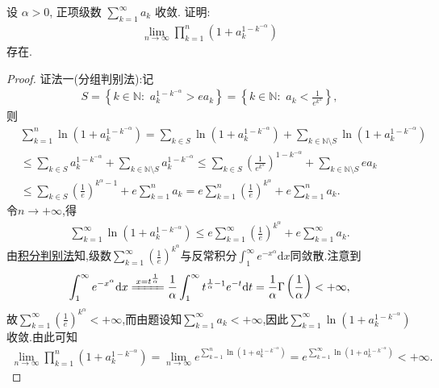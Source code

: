 \documentclass[../../main.tex]{subfiles}%
\begin{document}
\begin{example}
设 $\alpha>0$, 正项级数 $\sum\limits_{k=1}^{\infty} a_k$ 收敛. 证明:
\begin{align*}
\lim\limits_{n\to\infty} \prod\limits_{k=1}^{n} \left(1 + a_k^{1-k^{-\alpha}}\right)
\end{align*}
存在.
\end{example}
\begin{proof}

{\color{blue}证法一(分组判别法):}记
\begin{align*}
S=\left\{ k\in \mathbb{N} :\,\,a_{k}^{1-k^{-\alpha}}>ea_k \right\} =\left\{ k\in \mathbb{N} :\,\,a_k<\frac{1}{e^{k^{\alpha}}} \right\},
\end{align*}
则
\begin{align*}
&\sum\limits_{k=1}^n{\ln \left( 1+a_{k}^{1-k^{-\alpha}} \right)}=\sum\limits_{k\in S}{\ln \left( 1+a_{k}^{1-k^{-\alpha}} \right)}+\sum\limits_{k\in \mathbb{N} \setminus S}{\ln \left( 1+a_{k}^{1-k^{-\alpha}} \right)}
\\
&\leqslant \sum\limits_{k\in S}{a_{k}^{1-k^{-\alpha}}}+\sum\limits_{k\in \mathbb{N} \setminus S}{a_{k}^{1-k^{-\alpha}}}\leqslant \sum\limits_{k\in S}{\left( \frac{1}{e^{k^{\alpha}}} \right) ^{1-k^{-\alpha}}}+\sum\limits_{k\in \mathbb{N} \setminus S}{ea_k}
\\
&\leqslant \sum\limits_{k\in S}{\left( \frac{1}{e} \right) ^{k^{\alpha}-1}}+e\sum\limits_{k=1}^n{a_k}=e\sum\limits_{k=1}^n{\left( \frac{1}{e} \right) ^{k^{\alpha}}}+e\sum\limits_{k=1}^n{a_k}.
\end{align*}
令$n\rightarrow +\infty$,得
\begin{align*}
\sum\limits_{k=1}^{\infty}{\ln \left( 1+a_{k}^{1-k^{-\alpha}} \right)}\leqslant e\sum\limits_{k=1}^{\infty}{\left( \frac{1}{e} \right) ^{k^{\alpha}}}+e\sum\limits_{k=1}^{\infty}{a_k}.
\end{align*}
由\hyperref[theorem:积分判别法]{积分判别法}知,级数$\sum\limits_{k=1}^{\infty}{\left( \frac{1}{e} \right) ^{k^{\alpha}}}$与反常积分$\int_1^{\infty}{e^{-x^{\alpha}}\mathrm{d}x}$同敛散.注意到
\begin{align*}
\int_1^{\infty}{e^{-x^{\alpha}}\mathrm{d}x}\xlongequal{x=t^{\frac{1}{\alpha}}}\frac{1}{\alpha}\int_1^{\infty}{t^{\frac{1}{\alpha}-1}e^{-t}\mathrm{d}t}=\frac{1}{\alpha}\Gamma \left( \frac{1}{\alpha} \right) <+\infty,
\end{align*}
故$\sum\limits_{k=1}^{\infty}{\left( \frac{1}{e} \right) ^{k^{\alpha}}}<+\infty$,而由题设知$\sum\limits_{k=1}^{\infty}{a_k}<+\infty$,因此$\sum\limits_{k=1}^{\infty}{\ln \left( 1+a_{k}^{1-k^{-\alpha}} \right)}$收敛.由此可知
\begin{align*}
\lim\limits_{n\rightarrow \infty} \prod\limits_{k=1}^n{\left( 1+a_{k}^{1-k^{-\alpha}} \right)}=\lim\limits_{n\rightarrow \infty} e^{\sum\limits_{k=1}^n{\ln \left( 1+a_{k}^{1-k^{-\alpha}} \right)}}=e^{\sum\limits_{k=1}^{\infty}{\ln \left( 1+a_{k}^{1-k^{-\alpha}} \right)}}<+\infty.
\end{align*}


\end{proof}
\end{document}
